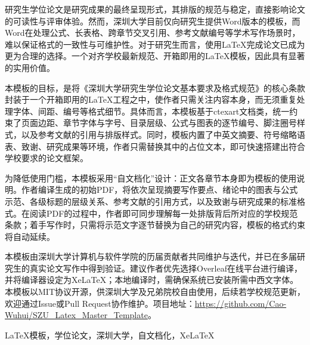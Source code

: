 \begin{abstractCN}
\setlength{\baselineskip}{23pt} %

研究生学位论文是研究成果的最终呈现形式，其排版的规范与稳定，直接影响论文的可读性与评审体验。然而，深圳大学目前仅向研究生提供Word版本的模板，而Word在处理公式、长表格、跨章节交叉引用、参考文献编号等学术写作场景时，难以保证格式的一致性与可维护性。对于研究生而言，使用LaTeX完成论文已成为更为合理的选择。一个对齐学校最新规范、开箱即用的\LaTeX{}模板，因此具有显著的实用价值。

本模板的目标，是将《深圳大学研究生学位论文基本要求及格式规范》的核心条款封装于一个开箱即用的\LaTeX{}工程之中，使作者只需关注内容本身，而无须重复处理字体、间距、编号等格式细节。具体而言，本模板基于ctexart文档类，统一约束了页面边距、章节字体与字号、目录层级、公式与图表的逐节编号、脚注圈号样式，以及参考文献的引用与排版样式。同时，模板内置了中英文摘要、符号缩略语表、致谢、研究成果等环境，作者只需替换其中的占位文本，即可快速搭建出符合学校要求的论文框架。

为降低使用门槛，本模板采用“自文档化”设计：正文各章节本身即为模板的使用说明。作者编译生成的初始PDF，将依次呈现摘要写作要点、绪论中的图表与公式示范、各级标题的层级关系、参考文献的引用方式，以及致谢与研究成果的标准格式。在阅读PDF的过程中，作者即可同步理解每一处排版背后所对应的学校规范条款；着手写作时，只需将示范文字逐节替换为自己的研究内容，模板的格式约束将自动延续。

本模板由深圳大学计算机与软件学院的历届贡献者共同维护与迭代，并已在多届研究生的真实论文写作中得到验证。建议作者优先选择Overleaf在线平台进行编译，并将编译器设定为XeLaTeX；本地编译时，需确保系统已安装所需中西文字体。本模板以MIT协议开源，供深圳大学及兄弟院校自由使用，后续若学校规范更新，欢迎通过Issue或Pull Request协作维护。项目地址：\url{https://github.com/Cao-Wuhui/SZU_Latex_Master_Template}。

\end{abstractCN}


\begin{keywordCN}
LaTeX模板，学位论文，深圳大学，自文档化，XeLaTeX
\end{keywordCN}

